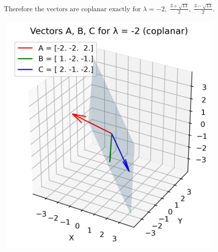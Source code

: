 \documentclass[journal]{IEEEtran}
\begin{document}
\begin{align*}
\boxed{\text{Therefore the vectors are coplanar exactly for }
\lambda=-2,\;\frac{3+\sqrt{13}}{2},\;\frac{3-\sqrt{13}}{2}.}
\end{align*}

\begin{figure}[H]
    \centering
    \includegraphics[width=0.66\columnwidth]{figs/01.png}
    \label{fig-1}
\end{figure}
\end{document}
